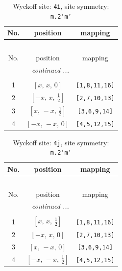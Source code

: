 \documentclass[fleqn,8pt]{jsarticle}
\begin{document}
\renewcommand{\arraystretch}{1.2}
\begin{longtable}{ccc}
\caption{Wyckoff site: {\tt 4i}, site symmetry: {\tt m.2'm'}}
 \\
 \hline \hline
No. & position & mapping \\ \hline \endfirsthead

\multicolumn{2}{l}{\tablename\ \thetable{}} \\
 \hline \hline
No. & position & mapping \\ \hline \endhead

 \hline \hline
\multicolumn{2}{r}{\footnotesize\it continued ...} \\ \endfoot

 \hline \hline
\multicolumn{2}{r}{} \\ \endlastfoot

1 & $\left[ x,\, x,\, 0 \right]$ & {\tt [1,8,11,16]} \\ \hline
2 & $\left[ - x,\, x,\, \frac{1}{2} \right]$ & {\tt [2,7,10,13]} \\ \hline
3 & $\left[ x,\, - x,\, \frac{1}{2} \right]$ & {\tt [3,6,9,14]} \\ \hline
4 & $\left[ - x,\, - x,\, 0 \right]$ & {\tt [4,5,12,15]} \\
\end{longtable}
\renewcommand{\arraystretch}{1.2}
\begin{longtable}{ccc}
\caption{Wyckoff site: {\tt 4j}, site symmetry: {\tt m.2'm'}}
 \\
 \hline \hline
No. & position & mapping \\ \hline \endfirsthead

\multicolumn{2}{l}{\tablename\ \thetable{}} \\
 \hline \hline
No. & position & mapping \\ \hline \endhead

 \hline \hline
\multicolumn{2}{r}{\footnotesize\it continued ...} \\ \endfoot

 \hline \hline
\multicolumn{2}{r}{} \\ \endlastfoot

1 & $\left[ x,\, x,\, \frac{1}{2} \right]$ & {\tt [1,8,11,16]} \\ \hline
2 & $\left[ - x,\, x,\, 0 \right]$ & {\tt [2,7,10,13]} \\ \hline
3 & $\left[ x,\, - x,\, 0 \right]$ & {\tt [3,6,9,14]} \\ \hline
4 & $\left[ - x,\, - x,\, \frac{1}{2} \right]$ & {\tt [4,5,12,15]} \\
\end{longtable}
\end{document}
